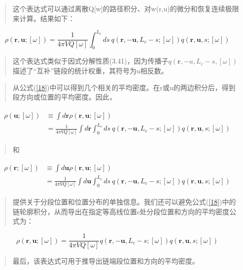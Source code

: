 \begin{quotation}
这个表达式可以通过离散Q[w]的路径积分、对w(r,u)的微分和恢复连续极限来计算。结果如下：
\end{quotation}
\begin{equation}\label{18}
\rho(\mathbf{r},\mathbf{u};[\omega])=\frac{1}{4\pi VQ[\omega]}\int_{0}^{L_c}ds~ q(\mathbf{r},-\mathbf{u},L_c-s;[\omega])q(\mathbf{r},\mathbf{u},s;[\omega])
\end{equation}
\begin{quotation}
这个表达式类似于因式分解性质(3.41)，因为传播子$q(\mathbf{r},-u,L_c-s,[\omega])$描述了“互补”链段的统计权重，其符号为u相反数。
\end{quotation}
\begin{quotation}
从公式(\ref{18})中可以得到几个相关的平均密度。在r或u的两边积分后，得到段方向或位置的平均密度。因此，
\end{quotation}
\begin{align}\label{19}
\begin{split}
\rho(\mathbf{u};[\omega])&\equiv\int d\mathbf{r} \rho(\mathbf{r},\mathbf{u};[\omega]) \\&=\frac{1}{4\pi VQ[\omega]}\int d\mathbf{r} \int_{0}^{L_c}ds~q(\mathbf{r},-\mathbf{u},L_c-s;[\omega])q(\mathbf{r},\mathbf{u},s;[\omega])
\end{split}
\end{align}
\begin{quotation}
和
\end{quotation}
\begin{align}\label{20}
\begin{split}
\rho(\mathbf{r};[\omega])&\equiv\int d\mathbf{u} \rho(\mathbf{r},\mathbf{u};[\omega]) \\&=\frac{1}{4\pi VQ[\omega]}\int d\mathbf{u} \int_{0}^{L_c}ds~q(\mathbf{r},-\mathbf{u},L_c-s;[\omega])q(\mathbf{r},\mathbf{u},s;[\omega])
\end{split}
\end{align}
\begin{quotation}
提供关于分段位置和位置分布的单独信息。我们还可以避免公式(\ref{18})中的链轮廓积分，从而导出在指定等高线位置s处分段位置和方向的平均密度公式为：
\end{quotation}
\begin{equation}\label{21}
\rho(\mathbf{r},\mathbf{u};[\omega])=\frac{1}{4\pi VQ[\omega]}q(\mathbf{r},-\mathbf{u},L_c-s;[\omega])q(\mathbf{r},\mathbf{u},s;[\omega])
\end{equation}
\begin{quotation}
最后，该表达式可用于推导出链端段位置和方向的平均密度。
\end{quotation}

